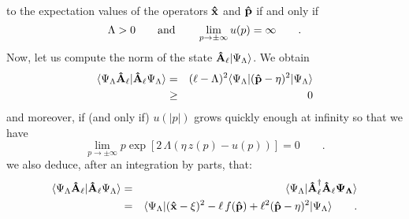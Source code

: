\documentclass[a4paper,10pt]{article}
\newcommand{\x}{\mbox{\rm{\bf \^ x}}}
\newcommand{\p}{\mbox{\rm{\bf \^ p}}}
\newcommand{\A}{\mbox{\rm{\bf \^ A}}}
\newcommand{\Ad}{\bf \mbox{\rm{\A}}^\dagger}
\begin{document}
to the expectation values of the operators $\x$ and $\p$ if and
only if
\begin{equation}
\Lambda>0\qquad {\rm and}\qquad
\lim_{p\to\pm\infty}u(p)=\infty\qquad . \label{as1}
\end{equation}
Now, let us compute the norm of the state
$\A_\ell|\Psi_\Lambda\rangle$. We obtain
\begin{eqnarray}
\langle \Psi_\Lambda\A_\ell|\A_\ell \Psi_\Lambda\rangle
&=&(\ell-\Lambda)^2 \langle\Psi_\Lambda|(\p
-\eta)^2|\Psi_\Lambda\rangle\label{ellL}\\
&\geq&0
\end{eqnarray}
and moreover, if (and only if) $u(|p|)$ grows quickly enough at
infinity so that we have
\begin{equation}
\lim_{p\to\pm\infty}p\exp[2\,\Lambda ( \eta \,z(p)-
u(p))]=0\qquad.\label{as2}
\end{equation}
we also deduce, after an integration by parts, that:
\begin{eqnarray}\label{AA1}
\langle \Psi_\Lambda\A_\ell|\A_\ell \Psi_\Lambda\rangle
&=&\langle\Psi_\Lambda|\Ad_\ell\A_\ell\Psi_\Lambda\rangle\\ &=&
\langle\Psi_\Lambda| (\x-\xi)^2-\ell\,f(\p)+\ell^2
(\p-\eta)^2|\Psi_\Lambda\rangle\qquad . \label{AA2}
\end{eqnarray}
\end{document}

